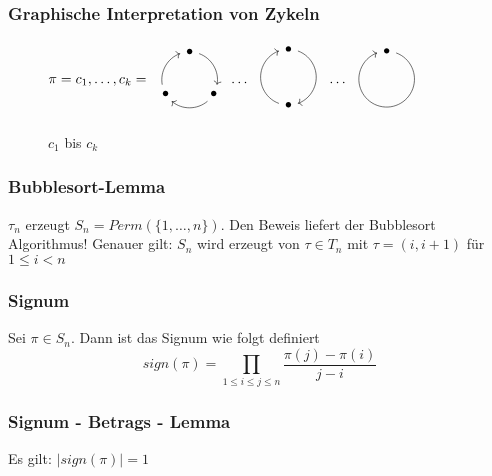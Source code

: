 \documentclass[12pt, german]{article}
\begin{document}
\subsubsection{Graphische Interpretation von Zykeln}
	\begin{figure}[h!]
		\centering
		$ \pi = c_1, \ldots, c_k = \begin{array}{ccc}
		\begin{tikzpicture}[->,scale=.7] 
		\foreach \a/\t in {90/.,-30/.,210/.}{
			\node (\t) at (\a:1cm) {$\bullet$};
			\draw (\a-20:1cm)  arc (\a-20:\a-100:1cm);
		} 
		\end{tikzpicture}
	\end{array} \ldots
	\begin{array}{ccc}
	\begin{tikzpicture}[->,scale=.7] 
	\foreach \a/\t in {90/.,-90/.}{
		\node (\t) at (\a:1cm) {$\bullet$};
		\draw (\a-20:1cm)  arc (\a-20:\a-160:1cm);
	} 
	\end{tikzpicture}
	\end{array}
	\ldots
	\begin{array}{ccc}
	\begin{tikzpicture}[->,scale=.7] 
	\foreach \a/\t in {90/.}{
		\node (\t) at (\a:1cm) {$\bullet$};
		\draw (\a-20:1cm)  arc (\a-20:\a-340:1cm);
	} 
	\end{tikzpicture}
	\end{array}$
	\caption{$c_1$ bis $c_k$}
	\end{figure}

\subsubsection{Bubblesort-Lemma}
	 $\tau_n$ erzeugt $S_n = Perm(\{1, \ldots, n\})$. Den Beweis liefert der Bubblesort Algorithmus! 
		Genauer gilt: $S_n$ wird erzeugt von $\tau \in T_n$ mit $\tau= (i, i+1)$ für $1 \leq i < n$

\subsubsection{Signum}
 	Sei $\pi \in S_n$. Dann ist das Signum wie folgt definiert $$sign(\pi) = \prod_{1 \leq i \leq j \leq n} \frac{\pi(j) - \pi(i)}{j -i}$$

\subsubsection{Signum - Betrags - Lemma}
	Es gilt: $|sign(\pi) |= 1$
\end{document}
